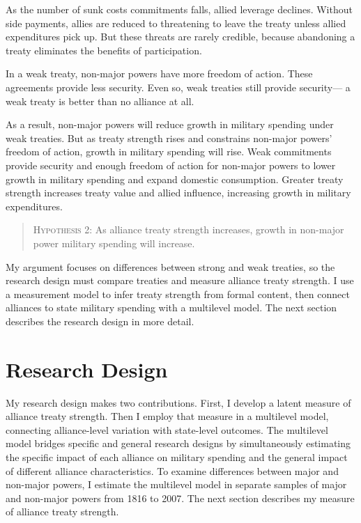 \documentclass[12pt]{article}
\begin{document}
As the number of sunk costs commitments falls, allied leverage declines. 
Without side payments, allies are reduced to threatening to leave the treaty unless allied expenditures pick up. 
But these threats are rarely credible, because abandoning a treaty eliminates the benefits of participation. 


In a weak treaty, non-major powers have more freedom of action.  
These agreements provide less security.  
Even so, weak treaties still provide security--- a weak treaty is better than no alliance at all. 


As a result, non-major powers will reduce growth in military spending under weak treaties. 
But as treaty strength rises and constrains non-major powers' freedom of action, growth in military spending will rise. 
Weak commitments provide security and enough freedom of action for non-major powers to lower growth in military spending and expand domestic consumption. 
Greater treaty strength increases treaty value and allied influence, increasing growth in military expenditures. 


\begin{quote}
\textsc{Hypothesis 2}: As alliance treaty strength increases, growth in non-major power military spending will increase. 
\end{quote}


My argument focuses on differences between strong and weak treaties, so the research design must compare treaties and measure alliance treaty strength.  
I use a measurement model to infer treaty strength from formal content, then connect alliances to state military spending with a multilevel model. 
The next section describes the research design in more detail. 



\section{Research Design} 


My research design makes two contributions. 
First, I develop a latent measure of alliance treaty strength. 
Then I employ that measure in a multilevel model, connecting alliance-level variation with state-level outcomes. 
The multilevel model bridges specific and general research designs by simultaneously estimating the specific impact of each alliance on military spending and the general impact of different alliance characteristics. 
To examine differences between major and non-major powers, I estimate the multilevel model in separate samples of major and non-major powers from 1816 to 2007. 
The next section describes my measure of alliance treaty strength. 
\end{document}
